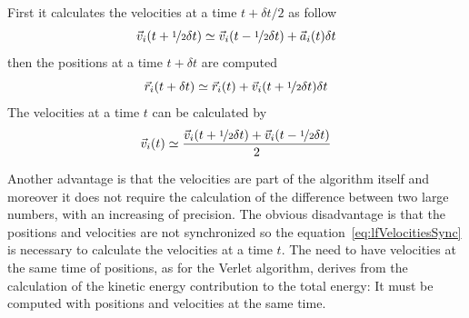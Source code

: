 First it calculates the velocities at a time $t+\delta t/2$ as follow
\begin{equation*}
	\vec v_i(t + \nicefrac{1}{2}\delta t) \simeq \vec v_i(t - \nicefrac{1}{2}\delta t) + \vec a_i(t)\delta t
\end{equation*}
then the positions at a time $t+\delta t$ are computed
\begin{equation*}
	\vec r_i(t + \delta t) \simeq \vec r_i(t) + \vec v_i(t + \nicefrac{1}{2}\delta t)\delta t
\end{equation*}
The velocities at a time $t$ can be calculated by
\begin{equation}
	\vec v_i(t) \simeq \frac{\vec v_i(t + \nicefrac{1}{2}\delta t) + \vec v_i(t - \nicefrac{1}{2}\delta t)}{2}
	\label{eq:lfVelocitiesSync}
\end{equation}

Another advantage is that the velocities are part of the algorithm itself and moreover it does not require the calculation of the difference between two large numbers, with an increasing of precision. The obvious disadvantage is that the positions and velocities are not synchronized so the equation~\eqref{eq:lfVelocitiesSync} is necessary to calculate the velocities at a time $t$. The need to have velocities at the same time of positions, as for the Verlet algorithm, derives from the calculation of the kinetic energy contribution to the total energy: It must be computed with positions and velocities at the same time.


